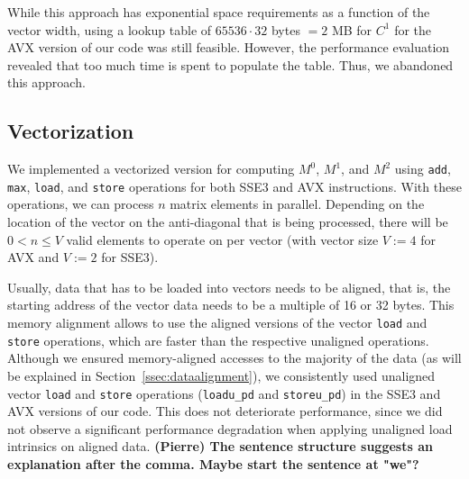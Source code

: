 \documentclass[runningheads,a4paper]{llncs}
\begin{document}
While this approach has exponential space requirements as a function of the vector width, using a lookup table of $65536 \cdot 32$ bytes $= 2$ MB for $C^1$ for
the AVX version of our code was still feasible.
However, the performance evaluation revealed that too much time is spent to populate the table.
Thus, we abandoned this approach.



\subsection{Vectorization}
\label{ssec:vectorization}

We implemented a vectorized version for computing
$M^0$, $M^1$, and $M^2$ using \texttt{add}, \texttt{max}, \texttt{load}, and \texttt{store}
operations for both SSE3 and AVX instructions.
With these operations, we can process $n$ matrix elements in parallel.
Depending on the location of the vector on the anti-diagonal that is being processed, there will be $0 < n \leq V$ valid elements to operate on
per vector (with vector size $V := 4$ for AVX and $V := 2$ for SSE3).

Usually, data that has to be loaded into vectors needs to be aligned, that is, the starting %
address of the vector data needs to be a multiple of 16 or 32 bytes. This memory alignment allows to
use the aligned versions of the vector \texttt{load} and \texttt{store} operations,
which are faster than the respective unaligned operations.
Although we ensured memory-aligned accesses to the majority of the data (as will be explained in
Section~\ref{ssec:dataalignment}), we consistently used unaligned vector \texttt{load} and \texttt{store}
operations (\texttt{loadu\_pd} and \texttt{storeu\_pd}) in the SSE3 and AVX versions of our code.
This does not deteriorate performance, since we did not observe a significant performance degradation when
applying unaligned load intrinsics on aligned data. \textbf{(Pierre) The sentence structure suggests an explanation after the comma. Maybe start the sentence at "we"?}
\end{document}
